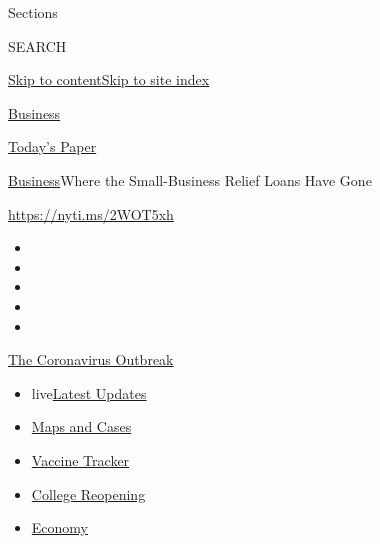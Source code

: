 Sections

SEARCH

\protect\hyperlink{site-content}{Skip to
content}\protect\hyperlink{site-index}{Skip to site index}

\href{https://www.nytimes3xbfgragh.onion/section/business}{Business}

\href{https://myaccount.nytimes3xbfgragh.onion/auth/login?response_type=cookie\&client_id=vi}{}

\href{https://www.nytimes3xbfgragh.onion/section/todayspaper}{Today's
Paper}

\href{/section/business}{Business}\textbar{}Where the Small-Business
Relief Loans Have Gone

\url{https://nyti.ms/2WOT5xh}

\begin{itemize}
\item
\item
\item
\item
\item
\end{itemize}

\href{https://www.nytimes3xbfgragh.onion/news-event/coronavirus?action=click\&pgtype=Article\&state=default\&region=TOP_BANNER\&context=storylines_menu}{The
Coronavirus Outbreak}

\begin{itemize}
\tightlist
\item
  live\href{https://www.nytimes3xbfgragh.onion/2020/08/04/world/coronavirus-cases.html?action=click\&pgtype=Article\&state=default\&region=TOP_BANNER\&context=storylines_menu}{Latest
  Updates}
\item
  \href{https://www.nytimes3xbfgragh.onion/interactive/2020/us/coronavirus-us-cases.html?action=click\&pgtype=Article\&state=default\&region=TOP_BANNER\&context=storylines_menu}{Maps
  and Cases}
\item
  \href{https://www.nytimes3xbfgragh.onion/interactive/2020/science/coronavirus-vaccine-tracker.html?action=click\&pgtype=Article\&state=default\&region=TOP_BANNER\&context=storylines_menu}{Vaccine
  Tracker}
\item
  \href{https://www.nytimes3xbfgragh.onion/2020/08/02/us/covid-college-reopening.html?action=click\&pgtype=Article\&state=default\&region=TOP_BANNER\&context=storylines_menu}{College
  Reopening}
\item
  \href{https://www.nytimes3xbfgragh.onion/live/2020/08/04/business/stock-market-today-coronavirus?action=click\&pgtype=Article\&state=default\&region=TOP_BANNER\&context=storylines_menu}{Economy}
\end{itemize}

